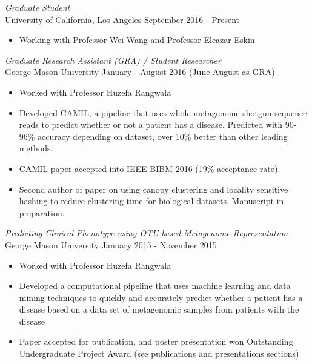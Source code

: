 \documentclass[margin, 10pt]{res} %
\begin{document}
\begin{resume}
{\sl Graduate Student} \\
University of California, Los Angeles \hfill September 2016 - Present
\begin{itemize} \itemsep -2pt %
\item Working with Professor Wei Wang and Professor Eleazar Eskin
\end{itemize}

{\sl Graduate Research Assistant (GRA) / Student Researcher} \\
George Mason University \hfill January - August 2016 (June-August as GRA)
\begin{itemize} \itemsep -2pt %
\item Worked with Professor Huzefa Rangwala 
\item Developed CAMIL, a pipeline that uses whole metagenome shotgun sequence reads to predict whether or not a patient has a disease. Predicted with 90-96\% accuracy depending on dataset, over 10\% better than other leading methods.
\item CAMIL paper accepted into IEEE BIBM 2016 (19\% acceptance rate).
\item Second author of paper on using canopy clustering and locality sensitive hashing to reduce clustering time for biological datasets. Manuscript in preparation.
\end{itemize}

{\sl Predicting Clinical Phenotype using OTU-based Metagenome Representation} \\
George Mason University  \hfill January 2015 - November 2015
\begin{itemize} \itemsep -2pt %
\item Worked with Professor Huzefa Rangwala
\item Developed a computational pipeline that uses machine learning and data mining techniques to quickly and accurately predict whether a patient has a disease based on a data set of metagenomic samples from patients with the disease
\item Paper accepted for publication, and poster presentation won Outstanding Undergraduate Project Award (see publications and presentations sections)
\end{itemize}

 

\end{resume}
\end{document}
